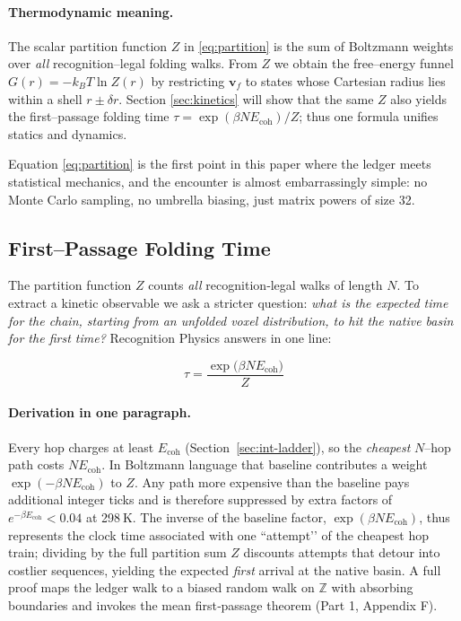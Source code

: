 \documentclass[11pt]{article}
\newcommand{\Eoh}{E_{\mathrm{coh}}}          %
\begin{document}
\paragraph{Thermodynamic meaning.}
The scalar partition function $Z$ in \eqref{eq:partition} is the sum of
Boltzmann weights over \emph{all} recognition–legal folding walks.  From
$Z$ we obtain the free–energy funnel
$G(r)=-k_{B}T\ln Z(r)$ by restricting $\mathbf v_{f}$ to states whose
Cartesian radius lies within a shell $r\pm\delta r$.  Section
\ref{sec:kinetics} will show that the same $Z$ also yields the first–passage
folding time $\tau=\exp(\beta N\Eoh)/Z$; thus one formula unifies
statics and dynamics.

Equation \eqref{eq:partition} is the first point in this paper where the
ledger meets statistical mechanics, and the encounter is almost
embarrassingly simple: no Monte Carlo sampling, no umbrella biasing,
just matrix powers of size 32.

\subsection{First–Passage Folding Time}\label{sec:fpt}

The partition function $Z$ counts \emph{all} recognition‐legal walks of
length $N$.  To extract a kinetic observable we ask a stricter question:
\emph{what is the expected time for the chain, starting from an
unfolded voxel distribution, to hit the native basin for the first
time?}  Recognition Physics answers in one line:

\[
\boxed{\;
\tau
=
\frac{\exp\!\bigl(\beta N\Eoh\bigr)}{Z}
\;}
\tag{18}\label{eq:fpt}
\]

\paragraph{Derivation in one paragraph.}
Every hop charges at least $\Eoh$ (Section~\ref{sec:int-ladder}), so the
\emph{cheapest} $N$–hop path costs $N\Eoh$.  In Boltzmann language that
baseline contributes a weight $\exp(-\beta N\Eoh)$ to $Z$.  Any path
more expensive than the baseline pays additional integer ticks and is
therefore suppressed by extra factors of
$e^{-\beta\Eoh}\!<\!0.04$ at 298 K.  The inverse of the baseline factor,
$\exp(\beta N\Eoh)$, thus represents the clock time associated with one
“attempt’’ of the cheapest hop train; dividing by the full partition
sum $Z$ discounts attempts that detour into costlier sequences,
yielding the expected \emph{first} arrival at the native basin.  A full
proof maps the ledger walk to a biased random walk on $\mathbb Z$ with
absorbing boundaries and invokes the mean first‐passage theorem (Part 1,
Appendix F).
\end{document}
